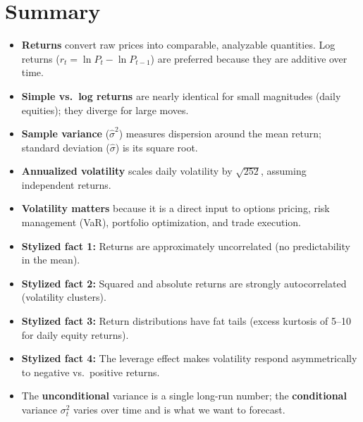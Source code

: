 
\section*{Summary}

\begin{itemize}[nosep]
  \item \textbf{Returns} convert raw prices into comparable, analyzable quantities.
  Log returns ($r_t = \ln P_t - \ln P_{t-1}$) are preferred because they are additive over time.

  \item \textbf{Simple vs.\ log returns} are nearly identical for small magnitudes (daily equities); they diverge for large moves.

  \item \textbf{Sample variance} ($\hat{\sigma}^2$) measures dispersion around the mean return; standard deviation ($\hat{\sigma}$) is its square root.

  \item \textbf{Annualized volatility} scales daily volatility by $\sqrt{252}$, assuming independent returns.

  \item \textbf{Volatility matters} because it is a direct input to options pricing, risk management (VaR), portfolio optimization, and trade execution.

  \item \textbf{Stylized fact 1:} Returns are approximately uncorrelated (no predictability in the mean).

  \item \textbf{Stylized fact 2:} Squared and absolute returns are strongly autocorrelated (volatility clusters).

  \item \textbf{Stylized fact 3:} Return distributions have fat tails (excess kurtosis of 5--10 for daily equity returns).

  \item \textbf{Stylized fact 4:} The leverage effect makes volatility respond asymmetrically to negative vs.\ positive returns.

  \item The \textbf{unconditional} variance is a single long-run number; the \textbf{conditional} variance $\sigma_t^2$ varies over time and is what we want to forecast.


\end{itemize}
